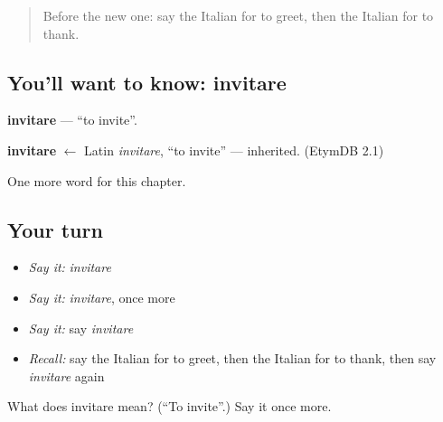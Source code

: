 \begin{quote}
Before the new one: say the Italian for to greet, then the Italian for to thank.
\end{quote}

\subsection*{You'll want to know: invitare}
\textbf{invitare} — \textquotedblleft{}to invite\textquotedblright{}.

\begin{cousinweb}
\textbf{invitare} $\leftarrow$ Latin \emph{invitare}, \textquotedblleft{}to invite\textquotedblright{} — inherited. (EtymDB 2.1)
\end{cousinweb}

\begin{grammarlens}[title={What you've built}]
One more word for this chapter.
\end{grammarlens}

\subsection*{Your turn}
\begin{itemize}
\raggedright
  \item \emph{Say it:} \emph{invitare}
  \item \emph{Say it:} \emph{invitare}, once more
  \item \emph{Say it:} say \emph{invitare}
  \item \emph{Recall:} say the Italian for to greet, then the Italian for to thank, then say \emph{invitare} again
\end{itemize}

\begin{tcolorbox}[breakable,colback=teal!4,colframe=teal!35!black,title={Before you move on}]
What does invitare mean? (\textquotedblleft{}To invite\textquotedblright{}.) Say it once more.
\end{tcolorbox}

